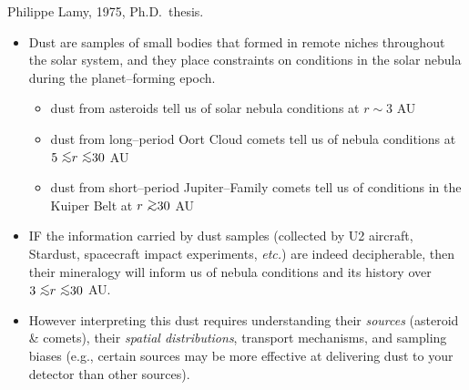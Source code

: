 \documentclass[20pt,35mmSlide,landscape]{foils}
\newcommand{\gtrsim}{\mbox{ \lower0.5ex\hbox{$\sim$} \kern-1.1em 
                 \raise0.5ex\hbox{$>$}}}
\newcommand{\lesssim}{\mbox{ \lower0.5ex\hbox{$\sim$} \kern-1.1em 
                 \raise0.5ex\hbox{$<$}}}
\begin{document}
{\small Philippe Lamy, 1975, Ph.D.\ thesis.}

\newpage
\pagecolor{light-yellow}
\small

\vspace*{-1.5in}\begin{itemize}

\item Dust are samples of small bodies that formed in remote
niches throughout the solar system, and they place
constraints on conditions in the solar nebula during the
planet--forming epoch.\vspace*{1ex}

\begin{itemize}

\item dust from asteroids tell us of solar nebula conditions
at $r\sim3$ AU\vspace*{1ex}

\item dust from long--period Oort Cloud comets tell us of nebula
conditions at $5\lesssim r\lesssim30$ AU\vspace*{1ex}

\item dust from short--period Jupiter--Family comets tell us
of conditions in the\\ Kuiper Belt at $r\gtrsim30$ AU\\

\end{itemize}

\item IF the information carried by dust samples
(collected by U2 aircraft, Stardust, spacecraft impact
experiments, {\it etc.}) are indeed decipherable, then their
mineralogy will inform us of nebula conditions and its history
over $3\lesssim r\lesssim30$ AU.\\

\item However interpreting this dust requires understanding their
{\sl sources} (asteroid \& comets), their {\sl spatial
distributions}, transport mechanisms, and sampling biases
(e.g., certain sources may be more effective at delivering dust
to your detector than other sources).

\end{itemize}

\pagecolor{light-yellow}
\normalsize
\end{document}
